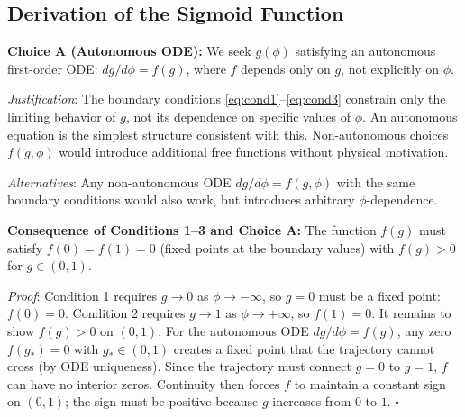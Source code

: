 \documentclass[11pt,a4paper]{article}
\begin{document}
\subsection{Derivation of the Sigmoid Function}

\begin{occam_box}
\textbf{Choice A (Autonomous ODE):} We seek $g(\phi)$ satisfying an autonomous first-order ODE: $dg/d\phi = f(g)$, where $f$ depends only on $g$, not explicitly on $\phi$.

\textit{Justification}: The boundary conditions \eqref{eq:cond1}--\eqref{eq:cond3} constrain only the limiting behavior of $g$, not its dependence on specific values of $\phi$. An autonomous equation is the simplest structure consistent with this. Non-autonomous choices $f(g, \phi)$ would introduce additional free functions without physical motivation.

\textit{Alternatives}: Any non-autonomous ODE $dg/d\phi = f(g, \phi)$ with the same boundary conditions would also work, but introduces arbitrary $\phi$-dependence.
\end{occam_box}

\begin{theorem_box}
\textbf{Consequence of Conditions 1--3 and Choice A:} The function $f(g)$ must satisfy $f(0) = f(1) = 0$ (fixed points at the boundary values) with $f(g) > 0$ for $g \in (0,1)$.

\textit{Proof}: Condition 1 requires $g \to 0$ as $\phi \to -\infty$, so $g=0$ must be a fixed point: $f(0) = 0$. Condition 2 requires $g \to 1$ as $\phi \to +\infty$, so $f(1) = 0$. It remains to show $f(g) > 0$ on $(0,1)$. For the autonomous ODE $dg/d\phi = f(g)$, any zero $f(g_*) = 0$ with $g_* \in (0,1)$ creates a fixed point that the trajectory cannot cross (by ODE uniqueness). Since the trajectory must connect $g=0$ to $g=1$, $f$ can have no interior zeros. Continuity then forces $f$ to maintain a constant sign on $(0,1)$; the sign must be positive because $g$ increases from $0$ to $1$. $\square$
\end{theorem_box}
\end{document}
